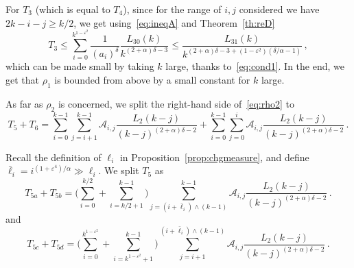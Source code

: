 \documentclass[10pt]{amsart}
\theoremstyle{definition}\newtheorem{defi}[theo]{Definition}\newtheorem{rema}[theo]{Remark}\newtheorem{exam}[theo]{Example}\newtheorem{exem}[theo]{Example}\newtheorem{nota}[theo]{Notation}
\newcommand{\ga}{\alpha}
\newcommand{\gd}{\delta}
\newcommand{\gep}{\varepsilon}
\newcommand{\cA}{\ensuremath{\mathcal{A}}}
\begin{document}
For $T_3$ (which is equal to $T_4$), since for the range of $i,j$ considered we have $2k-i-j \geq k/2$, we get using~\eqref{eq:ineqA} and Theorem~\ref{th:reD}
\begin{equation}
T_3 \le \sum_{i=0}^{k^{1-\gep^2}} \frac{1}{(a_i)^{\gd}}\frac{L_{30}(k)}{k^{(2+\ga) \delta - 3}} \leq \frac{L_{31}(k)}{ k^{(2+\ga) \delta - 3 +(1-\gep^2)(\gd/\ga-1)}}\,,
\end{equation}
which can be made small by taking $k$ large, thanks to~\eqref{eq:cond1}. In the end, we get that $\rho_1$ is bounded from above by a small constant for $k$ large.



As far as $\rho_2$ is concerned, we split the right-hand side of~\eqref{eq:rho2} to
\begin{equation}
T_5 + T_6 = \sum_{i=0}^{k-1} \sum_{j=i+1}^{k-1} \cA_{i,j} \frac{L_2(k-j)}{(k-j)^{(2+\ga)\delta -2}} + \sum_{i=0}^{k-1} \sum_{j=0}^{i} \cA_{i,j} \frac{L_2(k-j)}{(k-j)^{(2+\ga)\delta -2}}\,.
\end{equation}

Recall the definition of $\ell_i$ in Proposition~\ref{prop:chgmeasure}, and define $\bar \ell_i=i^{(1+\gep^4)/\ga} \gg \ell_i$. We split $T_5$ as
\begin{equation}
T_{5a} + T_{5b} = \bigg(\sum_{i=0}^{ k/2} + \sum_{i= k/2 + 1}^{k-1} \bigg) \sum_{j=(i + \bar \ell_i) \wedge (k-1)}^{k-1} \cA_{i,j} \frac{L_2(k-j)}{(k-j)^{(2+\ga)\delta -2}}\,.
\end{equation}
and
\begin{equation}
T_{5c} + T_{5d} = \bigg(\sum_{i=0}^{ k^{1- \gep^ 2} } + \sum_{i= k^{1- \gep^ 2} +1}^{k-1} \bigg) \sum_{j=i + 1}^{(i + \bar \ell_i) \wedge (k-1)} \cA_{i,j} \frac{L_2(k-j)}{(k-j)^{(2+\ga)\delta -2}}\,.
\end{equation}
\end{document}
